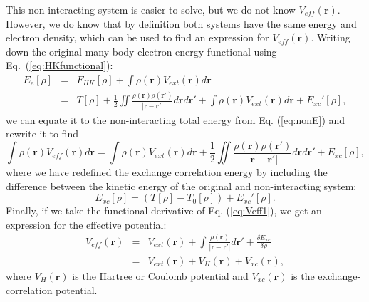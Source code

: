 \begin{refsection}
This non-interacting system is easier to solve, but we do not know $V_{eff}(\mathbf{r})$. However, we do know that by definition both systems have the same energy and electron density, which can be used to find an expression for $V_{eff}(\mathbf{r})$. Writing down the original many-body electron energy functional using Eq.~(\ref{eq:HKfunctional}):
\begin{eqnarray*}
E_e[\rho] &=& F_{HK}[\rho] + \int \rho(\mathbf{r}) V_{ext}(\mathbf{r}) d\mathbf{r}
\\ &= &T[\rho] + \frac{1}{2} \iint \frac{\rho(\mathbf{r})\rho(\mathbf{r'})}{\left| \mathbf{r} - \mathbf{r'}\right|} d\mathbf{r} d\mathbf{r'} + \int \rho(\mathbf{r}) V_{ext}(\mathbf{r}) d\mathbf{r} + E_{xc}'[\rho],
\end{eqnarray*}
we can equate it to the non-interacting total energy from Eq. (\ref{eq:nonE}) and rewrite it to find
\begin{equation}\label{eq:Veff1}
\int \rho(\mathbf{r}) V_{eff}(\mathbf{r}) d\mathbf{r} = \int \rho(\mathbf{r}) V_{ext}(\mathbf{r}) d\mathbf{r} + \frac{1}{2} \iint \frac{\rho(\mathbf{r})\rho(\mathbf{r'})}{\left| \mathbf{r} - \mathbf{r'}\right|}d\mathbf{r}d\mathbf{r'} + E_{xc}[\rho],
\end{equation}
where we have redefined the exchange correlation energy by including the difference between the kinetic energy of the original and non-interacting system:
\begin{equation}
E_{xc}[\rho] = (T[\rho] - T_0[\rho]) + E_{xc}'[\rho].
\end{equation}
Finally, if we take the functional derivative of Eq. (\ref{eq:Veff1}), we get an expression for the effective potential:
\begin{eqnarray}
V_{eff}(\mathbf{r}) &=& V_{ext}(\mathbf{r}) + \int \frac{\rho (\mathbf{r})}{\left| \mathbf{r} - \mathbf{r'} \right|} d\mathbf{r'} + \frac{\delta E_{xc}}{\delta \rho}
\\ \label{eq:Veff}&=& V_{ext}(\mathbf{r}) + V_{H}(\mathbf{r}) + V_{xc}(\mathbf{r}),
\end{eqnarray}
where $V_H(\mathbf{r})$ is the Hartree or Coulomb potential and $V_{xc}(\mathbf{r})$ is the exchange-correlation potential.


\end{refsection}
